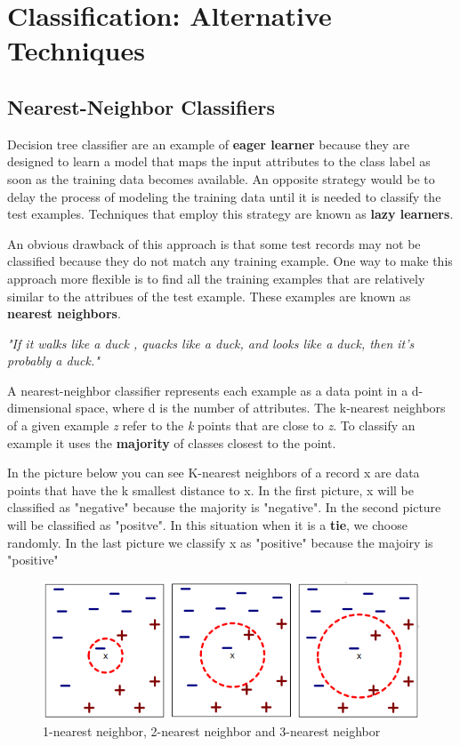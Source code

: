 \chapter{Classification: Alternative Techniques}

	\clearpage
	\section{Nearest-Neighbor Classifiers}

		Decision tree classifier are an example of {\bf eager learner} because
		they are designed to learn a model that maps the input attributes to 
		the class label as soon as the training data becomes available. 
		An opposite strategy would be to delay the process of modeling the 
		training data until it is needed to classify the test examples.
		Techniques that employ this strategy are known as {\bf lazy learners}.

		An obvious drawback of this approach is that some test records may not
		be classified because they do not match any training example. 
		One way to make this approach more flexible is to find all the
		training examples that are relatively similar to the attribues of the
		test example. These examples are known as {\bf nearest neighbors}.

		\vspace{0.3cm}
		{\it \Large "If it walks like a duck , quacks like a duck, and looks like a duck,
		then it's probably a duck."}

		\vspace{0.3cm}

		A nearest-neighbor classifier represents each example as a data point
		in a d-dimensional space, where d is the number of attributes. 
		The k-nearest neighbors of a given example {\it z} refer to the
		{\it k} points that are close to {\it z}.
		To classify an example it uses the {\bf majority} of classes closest to the point.

		In the picture below you can see K-nearest neighbors of a record x are data 
		points that have the k smallest distance to x. In the first picture, x will
		be classified as "negative" because the majority is "negative".
		In the second picture will be classified as "positve".
		In this situation when it is a {\bf tie}, we choose randomly. 
		In the last picture	we classify x as "positive" because the majoiry is "positive"
		
		\begin{figure}[H]
			\includegraphics[width=\textwidth]{pics/knearest.png}
			\caption{1-nearest neighbor, 2-nearest neighbor and 3-nearest neighbor}
		\end{figure}

